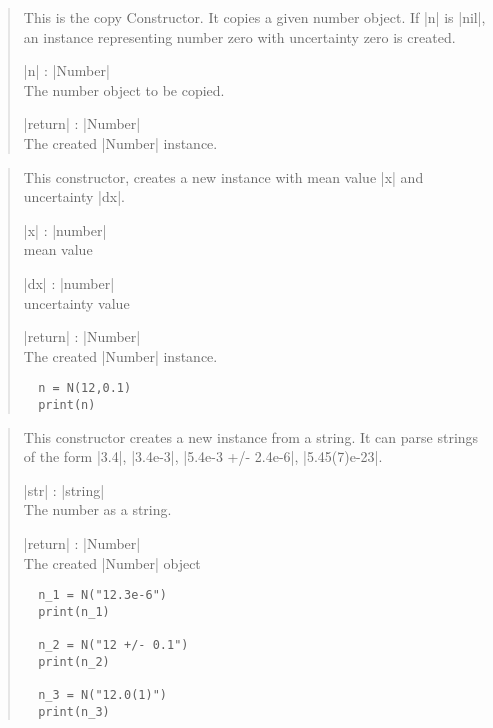 \documentclass{ltxdoc}
\begin{document}
\begin{quote}
  This is the copy Constructor. It copies a given number object. If |n| is |nil|, an instance representing number zero with uncertainty zero is created.

  \begin{description}
  \item |n| : |Number|\\
    The number object to be copied.

  \item |return| : |Number|\\
    The created |Number| instance.
  \end{description}

\end{quote}


\begin{quote}
  This constructor, creates a new instance with mean value |x| and uncertainty |dx|.

  \begin{description}
  \item |x| : |number|\\
    mean value

  \item |dx| : |number|\\
    uncertainty value

  \item |return| : |Number|\\
    The created |Number| instance.
  \end{description}

  \subtitle{Example}
  \begin{lstlisting}
  n = N(12,0.1)
  print(n)
  \end{lstlisting}

\end{quote}

\begin{quote}
  This constructor creates a new instance from a string. It can parse strings of the form |3.4|, |3.4e-3|, |5.4e-3 +/- 2.4e-6|, |5.45(7)e-23|. 

  \subtitle{Parameters / Return}
  \begin{description}
  \item |str| : |string|\\
    The number as a string.

  \item |return| : |Number|\\
    The created |Number| object
  \end{description}

  \subtitle{Example}
  \begin{lstlisting}
  n_1 = N("12.3e-6")
  print(n_1)

  n_2 = N("12 +/- 0.1")
  print(n_2)

  n_3 = N("12.0(1)")
  print(n_3)
  \end{lstlisting}
\end{quote}
\end{document}
